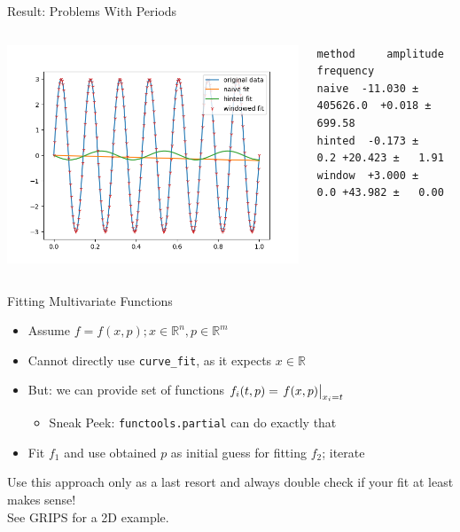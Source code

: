 
\begin{frame}[fragile]{Result: Problems With Periods}
%
\begin{columns}
\includegraphics[width=\linewidth]{./gfx/05-curvefit-fail}
%
\begin{cmdbox}
\begin{verbatim}
method     amplitude           frequency
naive  -11.030 ± 405626.0  +0.018 ± 699.58
hinted  -0.173 ±      0.2 +20.423 ±   1.91
window  +3.000 ±      0.0 +43.982 ±   0.00
\end{verbatim}
\end{cmdbox}
\end{columns}
%
\end{frame}


\begin{frame}{Fitting Multivariate Functions}
%
\begin{itemize}
\item Assume $f = f(x, p); x \in \mathbb{R}^{n}, p \in \mathbb{R}^{m}$
\item Cannot directly use \texttt{curve\_fit}, as it expects $x \in \mathbb{R}$
\item But: we can provide set of functions $f_i(t, p) = \eval{f(x, p)}_{x_i = t}$
	\begin{itemize}
	\item Sneak Peek: \texttt{functools.partial} can do exactly that
	\end{itemize}
\item Fit $f_1$ and use obtained $p$ as initial guess for fitting $f_2$; iterate
\end{itemize}
%
\begin{warnbox}
\small
Use this approach only as a last resort and always double check if your fit at least makes sense!\\
See GRIPS for a 2D example.
\end{warnbox}
%
\end{frame}

